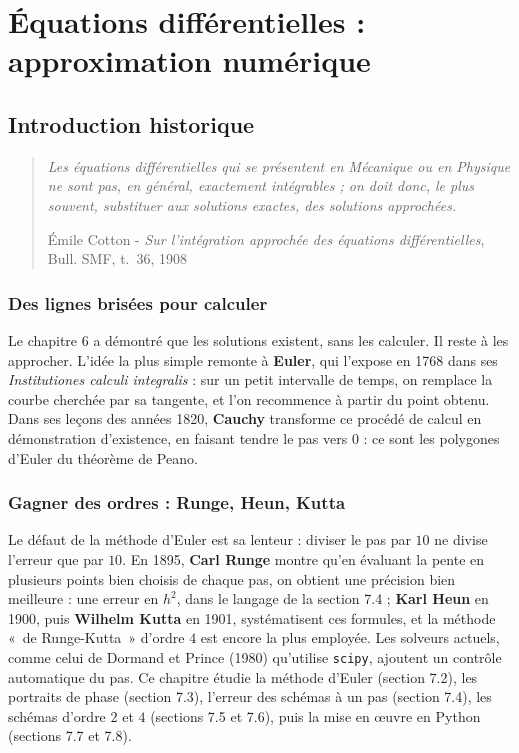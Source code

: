 \documentclass[a4paper,twoside]{report}
\begin{document}
\setcounter{chapter}{6}

\chapter[Équations différentielles : numérique]{Équations différentielles : approximation numérique}

\section{Introduction historique}

\begin{quote}
\emph{Les équations différentielles qui se présentent en Mécanique ou en Physique ne sont pas, en général, exactement intégrables ; on doit donc, le plus souvent, substituer aux solutions exactes, des solutions approchées.}
\begin{flushright}Émile Cotton - \emph{Sur l'intégration approchée des équations différentielles}, Bull. SMF, t.~36, 1908\end{flushright}
\end{quote}

\subsection{Des lignes brisées pour calculer}

Le chapitre 6 a démontré que les solutions existent, sans les calculer. Il reste à les approcher. L'idée la plus simple remonte à \textbf{Euler}, qui l'expose en 1768 dans ses \emph{Institutiones calculi integralis} : sur un petit intervalle de temps, on remplace la courbe cherchée par sa tangente, et l'on recommence à partir du point obtenu. Dans ses leçons des années 1820, \textbf{Cauchy} transforme ce procédé de calcul en démonstration d'existence, en faisant tendre le pas vers $0$ : ce sont les polygones d'Euler du théorème de Peano.

\subsection{Gagner des ordres : Runge, Heun, Kutta}

Le défaut de la méthode d'Euler est sa lenteur : diviser le pas par $10$ ne divise l'erreur que par $10$. En 1895, \textbf{Carl Runge} montre qu'en évaluant la pente en plusieurs points bien choisis de chaque pas, on obtient une précision bien meilleure : une erreur en $h^{2}$, dans le langage de la section 7.4 ; \textbf{Karl Heun} en 1900, puis \textbf{Wilhelm Kutta} en 1901, systématisent ces formules, et la méthode «~de Runge-Kutta~» d'ordre $4$ est encore la plus employée. Les solveurs actuels, comme celui de Dormand et Prince (1980) qu'utilise \texttt{scipy}, ajoutent un contrôle automatique du pas. Ce chapitre étudie la méthode d'Euler (section 7.2), les portraits de phase (section 7.3), l'erreur des schémas à un pas (section 7.4), les schémas d'ordre $2$ et $4$ (sections 7.5 et 7.6), puis la mise en œuvre en Python (sections 7.7 et 7.8).
\end{document}
